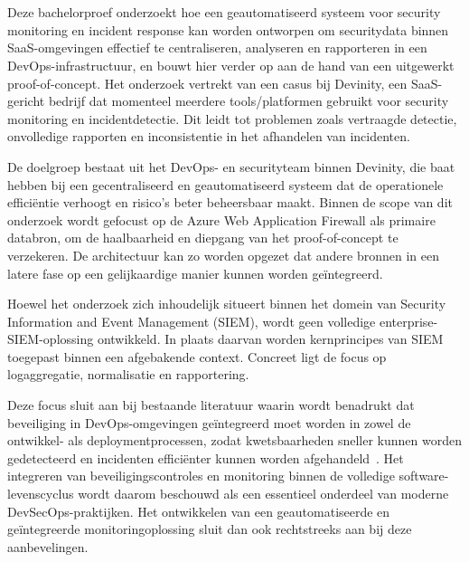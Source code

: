 
\chapter{}%
\label{ch:inleiding}

Deze bachelorproef onderzoekt hoe een geautomatiseerd systeem voor security monitoring en incident response kan worden ontworpen om securitydata binnen SaaS-omgevingen effectief te centraliseren, analyseren en rapporteren in een DevOps-infrastructuur, en bouwt hier verder op aan de hand van een uitgewerkt proof-of-concept. Het onderzoek vertrekt van een casus bij Devinity, een SaaS-gericht bedrijf dat momenteel meerdere tools/platformen gebruikt voor security monitoring en incidentdetectie. Dit leidt tot problemen zoals vertraagde detectie, onvolledige rapporten en inconsistentie in het afhandelen van incidenten.  

De doelgroep bestaat uit het DevOps- en securityteam binnen Devinity, die baat hebben bij een gecentraliseerd en geautomatiseerd systeem dat de operationele efficiëntie verhoogt en risico’s beter beheersbaar maakt. Binnen de scope van dit onderzoek wordt gefocust op de Azure Web Application Firewall als primaire databron, om de haalbaarheid en diepgang van het proof-of-concept te verzekeren. De architectuur kan zo worden opgezet dat andere bronnen in een latere fase op een gelijkaardige manier kunnen worden geïntegreerd.

Hoewel het onderzoek zich inhoudelijk situeert binnen het domein van Security Information and Event Management (SIEM), wordt geen volledige enterprise-SIEM-oplossing ontwikkeld. In plaats daarvan worden kernprincipes van SIEM toegepast binnen een afgebakende context. Concreet ligt de focus op logaggregatie, normalisatie en rapportering.

Deze focus sluit aan bij bestaande literatuur waarin wordt benadrukt dat beveiliging in DevOps-omgevingen geïntegreerd moet worden in zowel de ontwikkel- als deploymentprocessen, zodat kwetsbaarheden sneller kunnen worden gedetecteerd en incidenten efficiënter kunnen worden afgehandeld~\autocite{souppaya2022ssdf}. Het integreren van beveiligingscontroles en monitoring binnen de volledige software-levenscyclus wordt daarom beschouwd als een essentieel onderdeel van moderne DevSecOps-praktijken. Het ontwikkelen van een geautomatiseerde en geïntegreerde monitoringoplossing sluit dan ook rechtstreeks aan bij deze aanbevelingen.


